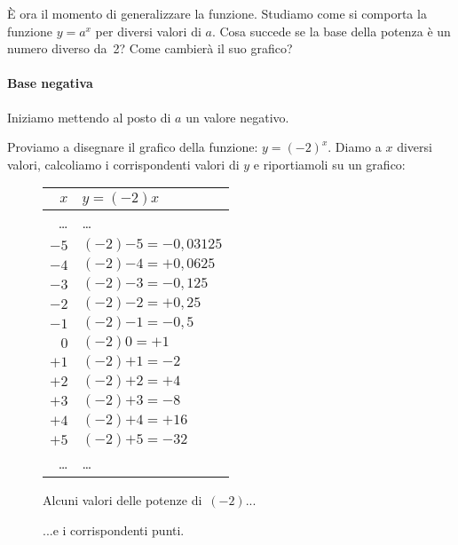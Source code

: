 È ora il momento di generalizzare la funzione. 
Studiamo come si comporta la funzione \(y=a^x\) per diversi valori di \(a\).
Cosa succede se la base della potenza è un numero diverso da~2? 
Come cambierà il suo grafico?

\paragraph{Base negativa}
\label{par:esplog_basenegativa}

Iniziamo mettendo al posto di \(a\) un valore negativo.

Proviamo a disegnare il grafico della funzione: \(y=(-2)^x\).
Diamo a \(x\) diversi valori, calcoliamo i corrispondenti valori di \(y\) e 
riportiamoli su un grafico:

\begin{figure}[h]
 \centering
 \begin{minipage}[]{.48\textwidth}
 \vspace*{.6cm}
  \begin{center}
   \begin{tabular}{r|l}
    $x$   & $y=(-2)x$ \\
    \hline
    \dots & \dots \\
    $-5$ & $(-2){-5} = -0,03125$ \\
    $-4$ & $(-2){-4} = +0,0625$ \\
    $-3$ & $(-2){-3} = -0,125$ \\
    $-2$ & $(-2){-2} = +0,25$ \\
    $-1$ & $(-2){-1} = -0,5$ \\
    $0$ & $(-2){0} = +1$ \\
    $+1$ & $(-2){+1} = -2$ \\
    $+2$ & $(-2){+2} = +4$ \\
    $+3$ & $(-2){+3} = -8$ \\
    $+4$ & $(-2){+4} = +16$ \\
    $+5$ & $(-2){+5} = -32$ \\
    \dots & \dots \\
   \end{tabular}
 \vspace*{.6cm}
  \caption{Alcuni valori delle potenze di~\((-2)\)...} \label{tab:potmenodue0}
  \end{center}
 \end{minipage}
\begin{minipage}[]{.48\textwidth}
\begin{center}
\begin{inaccessibleblock}
  \puntimenodue
  \caption{...e i corrispondenti punti.} \label{fig:potmenodue0}
\end{inaccessibleblock}
\end{center}
\end{minipage}
\end{figure}

